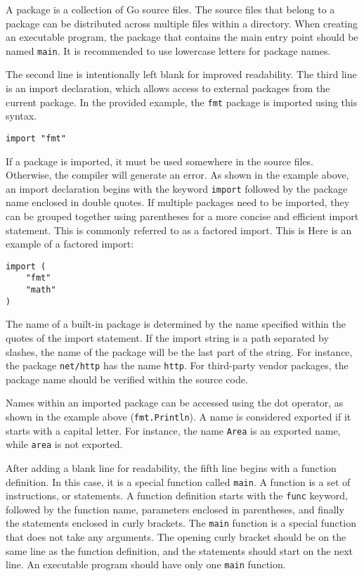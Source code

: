 A package is a collection of Go source files. The source files that belong to a
package can be distributed across multiple files within a directory. When
creating an executable program, the package that contains the main entry point
should be named \texttt{main}. It is recommended to use lowercase letters for
package names.

The second line is intentionally left blank for improved readability. The third
line is an import declaration, which allows access to external packages from the
current package. In the provided example, the \texttt{fmt} package is imported
using this syntax.

\begin{lstlisting}[numbers=none]
import "fmt"
\end{lstlisting}

If a package is imported, it must be used somewhere in the source files.
Otherwise, the compiler will generate an error. As shown in the example above,
an import declaration begins with the keyword \texttt{import} followed by the
package name enclosed in double quotes. If multiple packages need to be
imported, they can be grouped together using parentheses for a more concise and
efficient import statement. This is commonly referred to as a factored import.
This is Here is an example of a factored import:

\begin{lstlisting}[numbers=none]
import (
    "fmt"
    "math"
)
\end{lstlisting}

The name of a built-in package is determined by the name specified within the
quotes of the import statement. If the import string is a path separated by
slashes, the name of the package will be the last part of the string. For
instance, the package \texttt{net/http} has the name \texttt{http}. For
third-party vendor packages, the package name should be verified within the
source code.

Names within an imported package can be accessed using the dot operator, as
shown in the example above (\texttt{fmt.Println}). A name is considered exported
if it starts with a capital letter. For instance, the name \texttt{Area} is an
exported name, while \texttt{area} is not exported.

After adding a blank line for readability, the fifth line begins with a function
definition. In this case, it is a special function called \texttt{main}. A
function is a set of instructions, or statements. A function definition starts
with the \texttt{func} keyword, followed by the function name, parameters
enclosed in parentheses, and finally the statements enclosed in curly brackets.
The \texttt{main} function is a special function that does not take any
arguments. The opening curly bracket should be on the same line as the function
definition, and the statements should start on the next line. An executable
program should have only one \texttt{main} function.

